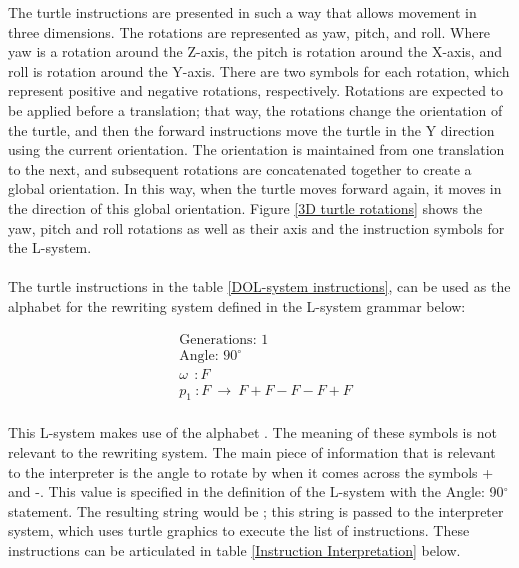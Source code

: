 \noindent
The turtle instructions are presented in such a way that allows movement in three dimensions. The rotations are represented as yaw, pitch, and roll. Where yaw is a rotation around the Z-axis, the pitch is rotation around the X-axis, and roll is rotation around the Y-axis. There are two symbols for each rotation, which represent positive and negative rotations, respectively. Rotations are expected to be applied before a translation; that way, the rotations change the orientation of the turtle, and then the forward instructions move the turtle in the Y direction using the current orientation. The orientation is maintained from one translation to the next, and subsequent rotations are concatenated together to create a global orientation. In this way, when the turtle moves forward again, it moves in the direction of this global orientation. Figure \ref{3D turtle rotations} shows the yaw, pitch and roll rotations as well as their axis and the instruction symbols for the L-system.\\
\\
The turtle instructions in the table \ref{DOL-system instructions}, can be used as the alphabet for the rewriting system defined in the L-system grammar below:

\begin{equation} \label{DOL-system example}
\begin{aligned}
	&\text{Generations: 1}\\
	&\text{Angle: 90$^{\circ}$}\\
	&\omega~~ : F \\
	&p_1~ :  F~ \rightarrow~ F+F-F-F+F\\
\end{aligned}
\end{equation}

\noindent
This L-system makes use of the alphabet . The meaning of these symbols is not relevant to the rewriting system. The main piece of information that is relevant to the interpreter is the angle to rotate by when it comes across the symbols + and -. This value is specified in the definition of the L-system with the Angle: 90$^{\circ}$ statement. The resulting string would be ; this string is passed to the interpreter system, which uses turtle graphics to execute the list of instructions. These instructions can be articulated in table \ref{Instruction Interpretation} below.


